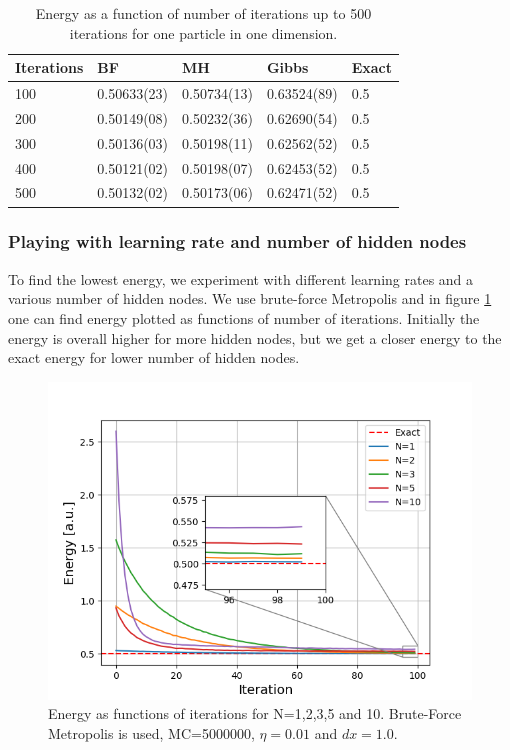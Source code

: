 \documentclass[norsk,a4paper,12pt]{article}
\begin{document}
\begin{table} [H]
	\caption{Energy as a function of number of iterations up to 500 iterations for one particle in one dimension. \vspace{2mm}}
	\begin{tabularx}{\textwidth}{X|XXXX} \hline\hline
		\label{tab:energies1P1D}
		Iterations & BF & MH & Gibbs & Exact \\ \hline
				100 & 0.50633(23) & 0.50734(13) & 0.63524(89) & 0.5 \\
				200 & 0.50149(08) & 0.50232(36) & 0.62690(54) & 0.5 \\
				300 & 0.50136(03) & 0.50198(11) & 0.62562(52) & 0.5 \\
				400 & 0.50121(02) & 0.50198(07) & 0.62453(52) & 0.5 \\
				500 & 0.50132(02) & 0.50173(06) & 0.62471(52) & 0.5 \\ \hline
	\end{tabularx}
\end{table}

\subsubsection{Playing with learning rate and number of hidden nodes}
To find the lowest energy, we experiment with different learning rates and a various number of hidden nodes. We use brute-force Metropolis and in figure \ref{fig:compare_nodes} one can find energy plotted as  functions of number of iterations. Initially the energy is overall higher for more hidden nodes, but we get a closer energy to the exact energy for lower number of hidden nodes. 

 \begin{figure} [H]
 	\centering
 	\includegraphics[scale=0.8]{plots/energy_compare_nodes.png}
 	\caption{Energy as functions of iterations for N=1,2,3,5 and 10. Brute-Force Metropolis is used, MC=5000000, $\eta=0.01$ and $dx=1.0$.}
 	\label{fig:compare_nodes}
 \end{figure}
 
\end{document}
